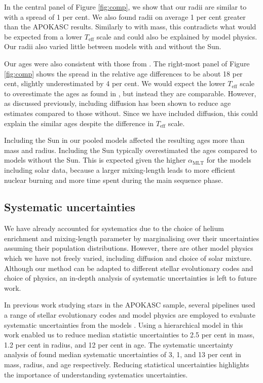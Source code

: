 \documentclass[fleqn,usenatbib]{mnras}
\newcommand{\teff}{\ensuremath{T_\mathrm{eff}}}
\newcommand{\mlt}{\ensuremath{{\alpha_\mathrm{MLT}}}}
\begin{document}
In the central panel of Figure \ref{fig:comp}, we show that our radii are similar to  with a spread of 1 per cent. We also found radii on average 1 per cent greater than the APOKASC results. Similarly to with mass, this contradicts what would be expected from a lower $\teff$ scale and could also be explained by model physics. Our radii also varied little between models with and without the Sun.

Our ages were also consistent with those from . The right-most panel of Figure \ref{fig:comp} shows the spread in the relative age differences to be about 18 per cent, slightly underestimated by 4 per cent. We would expect the lower $\teff$ scale to overestimate the ages as found in , but instead they are comparable. However, as discussed previously, including diffusion has been shown to reduce age estimates compared to those without. Since we have included diffusion, this could explain the similar ages despite the difference in $\teff$ scale.

Including the Sun in our pooled models affected the resulting ages more than mass and radius. Including the Sun typically overestimated the ages compared to models without the Sun. This is expected given the higher $\mlt$ for the models including solar data, because a larger mixing-length leads to more efficient nuclear burning and more time spent during the main sequence phase. 

\subsection{Systematic uncertainties}\label{sec:sys}

We have already accounted for systematics due to the choice of helium enrichment and mixing-length parameter by marginalising over their uncertainties assuming their population distributions. However, there are other model physics which we have not freely varied, including diffusion and choice of solar mixture. Although our method can be adapted to different stellar evolutionary codes and choice of physics, an in-depth analysis of systematic uncertainties is left to future work. 

In previous work studying stars in the APOKASC sample, several pipelines used a range of stellar evolutionary codes and model physics are employed to evaluate systematic uncertainties from the models \citep{Serenelli.Johnson.ea2017, SilvaAguirre.Lund.ea2017}. Using a hierarchical model in this work enabled us to reduce median statistic uncertainties to 2.5 per cent in mass, 1.2 per cent in radius, and 12 per cent in age. The systematic uncertainty analysis of  found median systematic uncertainties of 3, 1, and 13 per cent in mass, radius, and age respectively. Reducing statistical uncertainties highlights the importance of understanding systematics uncertainties.
\end{document}
